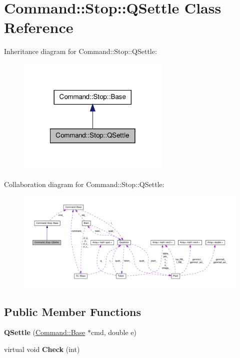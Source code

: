 \hypertarget{classCommand_1_1Stop_1_1QSettle}{\section{\-Command\-:\-:\-Stop\-:\-:\-Q\-Settle \-Class \-Reference}
\label{classCommand_1_1Stop_1_1QSettle}
}


\-Inheritance diagram for \-Command\-:\-:\-Stop\-:\-:\-Q\-Settle\-:\nopagebreak
\begin{figure}[H]
\begin{center}
\leavevmode
\includegraphics[width=206pt]{classCommand_1_1Stop_1_1QSettle__inherit__graph}
\end{center}
\end{figure}


\-Collaboration diagram for \-Command\-:\-:\-Stop\-:\-:\-Q\-Settle\-:\nopagebreak
\begin{figure}[H]
\begin{center}
\leavevmode
\includegraphics[width=350pt]{classCommand_1_1Stop_1_1QSettle__coll__graph}
\end{center}
\end{figure}
\subsection*{\-Public \-Member \-Functions}
\begin{DoxyCompactItemize}
\item 
\hypertarget{classCommand_1_1Stop_1_1QSettle_a36fc1f9244be5b81c8833243146e1ae9}{{\bfseries \-Q\-Settle} (\hyperlink{classCommand_1_1Base}{\-Command\-::\-Base} $\ast$cmd, double e)}\label{classCommand_1_1Stop_1_1QSettle_a36fc1f9244be5b81c8833243146e1ae9}

\item 
\hypertarget{classCommand_1_1Stop_1_1QSettle_a3c2e37dbd4fdf4cc45fea9014d6cde8e}{virtual void {\bfseries \-Check} (int)}\label{classCommand_1_1Stop_1_1QSettle_a3c2e37dbd4fdf4cc45fea9014d6cde8e}

\end{DoxyCompactItemize}
